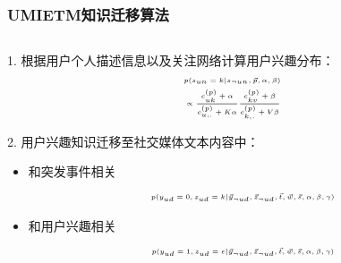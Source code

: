 \begin{frame}
\frametitle{\noindent UMIETM知识迁移算法}

\begin{columns}
\begin{column}[T]{0.42\paperwidth}
1. 根据用户个人描述信息以及关注网络计算用户兴趣分布：
\setlength{\abovedisplayskip}{1pt}
\setlength{\belowdisplayskip}{1pt}
\begin{equation}
\tiny
\label{timeUserTagLDAIVsamplingForS}
\begin{aligned}
&p(s_{un}=k|s_{\neg{un}},\vec{p},\alpha,\beta)\\
&\propto \frac{c^{(p)}_{uk}+\alpha}{c^{(p)}_{u,.}+K\alpha}
\frac{c^{(p)}_{kv}+\beta}{c^{(p)}_{k,.}+V\beta}\\
\end{aligned}
\end{equation}

2. 用户兴趣知识迁移至社交媒体文本内容中：
\begin{itemize}
	\item 和突发事件相关 
\begin{align*}
\tiny
\begin{aligned}
&p(y_{ud}=0,z_{ud}=k|\vec{y}_{\neg{ud}},\vec{z}_{\neg{ud}},\vec{t},\vec{w},\vec{s},\alpha,\beta,\gamma)\\
\end{aligned}
\end{align*}
	\item 和用户兴趣相关
\begin{align*}
\tiny
\begin{aligned}
&p(y_{ud}=1,z_{ud}=e|\vec{y}_{\neg{ud}},\vec{z}_{\neg{ud}},\vec{t},\vec{w},\vec{s},\alpha,\beta,\gamma)\\
\end{aligned}
\end{align*}

\end{itemize}

\end{column}


\end{columns}
\end{frame}
